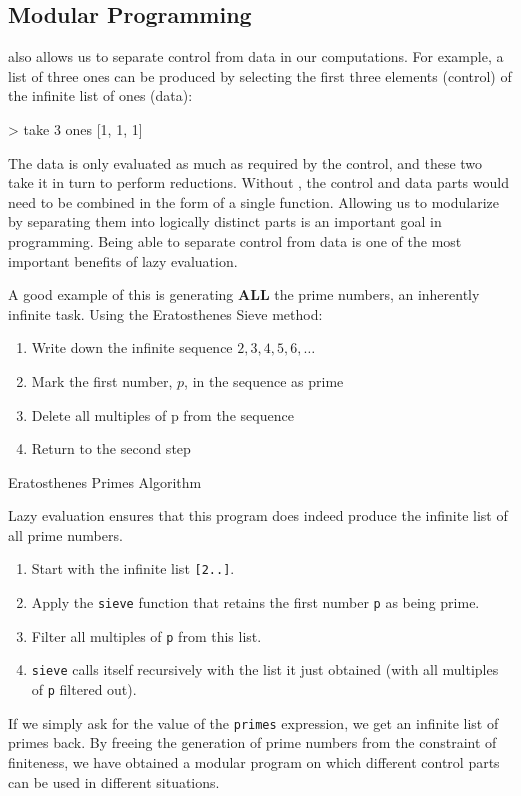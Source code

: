 \subsection{Modular Programming}\label{subsec:Modular_Programming}
 also allows us to separate control from data in our computations.
For example, a list of three ones can be produced by selecting the first three elements (control) of the infinite list of ones (data):
\begin{haskellsource}
> take 3 ones
[1, 1, 1]
\end{haskellsource}

The data is only evaluated as much as required by the control, and these two take it in turn to perform reductions.
Without , the control and data parts would need to be combined in the form of a single function.
Allowing us to modularize by separating them into logically distinct parts is an important goal in programming.
Being able to separate control from data is one of the most important benefits of lazy evaluation.

A good example of this is generating \textbf{ALL} the prime numbers, an inherently infinite task.
Using the Eratosthenes Sieve method:
\begin{enumerate}[noitemsep]
\item Write down the infinite sequence $2, 3, 4, 5, 6, \ldots$
\item Mark the first number, $p$, in the sequence as prime
\item Delete all multiples of p from the sequence
\item Return to the second step
\end{enumerate}

\begin{listing}[h!tbp]
\caption{Eratosthenes Primes Algorithm}
\label{lst:Eratosthenes_Primes}
\end{listing}

Lazy evaluation ensures that this program does indeed produce the infinite list of all prime numbers.
\begin{enumerate}[noitemsep]
\item Start with the infinite list \texttt{[2..]}.
\item Apply the \texttt{sieve} function that retains the first number \texttt{p} as being prime.
\item Filter all multiples of \texttt{p} from this list.
\item \texttt{sieve} calls itself recursively with the list it just obtained (with all multiples of \texttt{p} filtered out).
\end{enumerate}

If we simply ask for the value of the \texttt{primes} expression, we get an infinite list of primes back.
By freeing the generation of prime numbers from the constraint of finiteness, we have obtained a modular program on which different control parts can be used in different situations.



